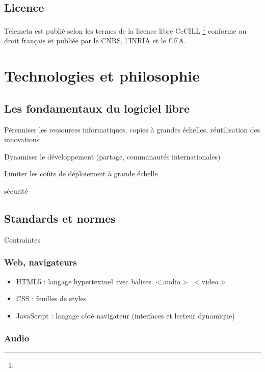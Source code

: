 \documentclass[a4paper,11pt,french]{article}
\begin{document}
\subsection{Licence}

Telemeta est publié selon les termes de la licence libre CeCILL \footnote{} conforme au droit français et publiée par le CNRS, l'INRIA et le CEA.



\section{Technologies et philosophie}


\subsection{Les fondamentaux du logiciel libre}

Pérenniser les ressources informatiques, copies à grandes échelles, réutilisation des innovations

Dynamiser le développement (partage, communautés internationales)

Limiter les coûts de déploiement à grande échelle

sécurité



\subsection{Standards et normes}

Contraintes

\subsubsection{Web, navigateurs}

    \begin{itemize}
     \item HTML5 : langage hypertextuel avec balises $<$audio$>$ $<$video$>$
     \item CSS : feuilles de styles
     \item JavaScript : langage côté navigateur (interfaces et lecteur dynamique)
    \end{itemize}

\subsubsection{Audio}
\end{document}

